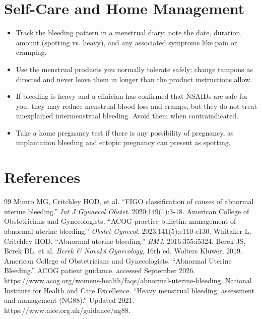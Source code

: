 \section*{Self-Care and Home Management}
\begin{itemize}
 \item Track the bleeding pattern in a menstrual diary: note the date, duration, amount (spotting vs. heavy), and any associated symptoms like pain or cramping.
 \item Use the menstrual products you normally tolerate safely; change tampons as directed and never leave them in longer than the product instructions allow.
 \item If bleeding is heavy and a clinician has confirmed that NSAIDs are safe for you, they may reduce menstrual blood loss and cramps, but they do not treat unexplained intermenstrual bleeding. Avoid them when contraindicated.
 \item Take a home pregnancy test if there is any possibility of pregnancy, as implantation bleeding and ectopic pregnancy can present as spotting.
\end{itemize}

\section*{References}
\begin{thebibliography}{99}
 Munro MG, Critchley HOD, et al. ``FIGO classification of causes of abnormal uterine bleeding.'' \textit{Int J Gynaecol Obstet}. 2020;149(1):3-18.
 American College of Obstetricians and Gynecologists. ``ACOG practice bulletin: management of abnormal uterine bleeding.'' \textit{Obstet Gynecol}. 2023;141(5):e110-e130.
 Whitaker L, Critchley HOD. ``Abnormal uterine bleeding.'' \textit{BMJ}. 2016;355:i5324.
 Berek JS, Berek DL, et al. \textit{Berek \& Novak\'s Gynecology}, 16th ed. Wolters Kluwer, 2019.
 American College of Obstetricians and Gynecologists. ``Abnormal Uterine Bleeding.'' ACOG patient guidance, accessed September 2026. https://www.acog.org/womens-health/faqs/abnormal-uterine-bleeding.
 National Institute for Health and Care Excellence. ``Heavy menstrual bleeding: assessment and management (NG88).'' Updated 2021. https://www.nice.org.uk/guidance/ng88.
\end{thebibliography}
